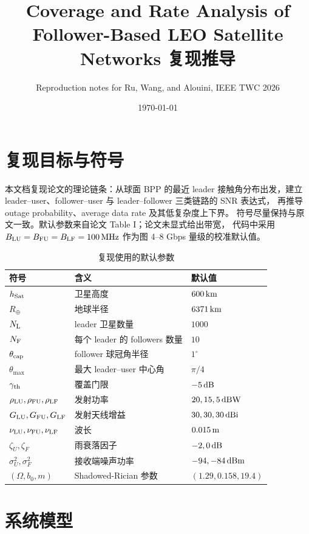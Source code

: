 \documentclass[UTF8,a4paper,11pt]{ctexart}
\title{Coverage and Rate Analysis of Follower-Based LEO Satellite Networks 复现推导}
\author{Reproduction notes for Ru, Wang, and Alouini, IEEE TWC 2026}
\date{\today}
\newcommand{\Rearth}{R_{\oplus}}
\newcommand{\thetac}{\theta_{\rm cap}}
\newcommand{\thetam}{\theta_{\max}}
\newcommand{\NL}{N_{\rm L}}
\newcommand{\NF}{N_{\rm F}}
\begin{document}
\maketitle

\section{复现目标与符号}

本文档复现论文的理论链条：从球面 BPP 的最近 leader 接触角分布出发，建立
leader--user、follower--user 与 leader--follower 三类链路的 SNR 表达式，
再推导 outage probability、average data rate 及其低复杂度上下界。
符号尽量保持与原文一致。默认参数来自论文 Table I；论文未显式给出带宽，
代码中采用 $B_{\rm LU}=B_{\rm FU}=B_{\rm LF}=100\,{\rm MHz}$ 作为图 4--8
Gbps 量级的校准默认值。

\begin{table}[htbp]
\centering
\caption{复现使用的默认参数}
\begin{tabular}{lll}
\toprule
符号 & 含义 & 默认值\\
\midrule
$h_{\rm Sat}$ & 卫星高度 & $600\,{\rm km}$\\
$\Rearth$ & 地球半径 & $6371\,{\rm km}$\\
$\NL$ & leader 卫星数量 & $1000$\\
$\NF$ & 每个 leader 的 followers 数量 & $10$\\
$\thetac$ & follower 球冠角半径 & $1^\circ$\\
$\thetam$ & 最大 leader--user 中心角 & $\pi/4$\\
$\gamma_{\rm th}$ & 覆盖门限 & $-5\,{\rm dB}$\\
$\rho_{\rm LU},\rho_{\rm FU},\rho_{\rm LF}$ & 发射功率 & $20,15,5\,{\rm dBW}$\\
$G_{\rm LU},G_{\rm FU},G_{\rm LF}$ & 发射天线增益 & $30,30,30\,{\rm dBi}$\\
$\nu_{\rm LU},\nu_{\rm FU},\nu_{\rm LF}$ & 波长 & $0.015\,{\rm m}$\\
$\zeta_U,\zeta_F$ & 雨衰落因子 & $-2,0\,{\rm dB}$\\
$\sigma_U^2,\sigma_F^2$ & 接收端噪声功率 & $-94,-84\,{\rm dBm}$\\
$(\Omega,b_0,m)$ & Shadowed-Rician 参数 & $(1.29,0.158,19.4)$\\
\bottomrule
\end{tabular}
\end{table}

\section{系统模型}
\end{document}
